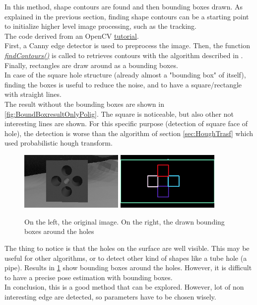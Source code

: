In this method, shape contours are found and then bounding boxes drawn. As explained in the previous section, finding shape contours can be a starting point to initialize higher level image processing, such as the tracking.\\
The code derived from an OpenCV \href{https://docs.opencv.org/3.4.6/de/d62/tutorial_bounding_rotated_ellipses.html}{tutorial}.\\
First, a Canny edge detector is used to preprocess the image. Then, the function \href{https://docs.opencv.org/3.4.6/d3/dc0/group__imgproc__shape.html#ga17ed9f5d79ae97bd4c7cf18403e1689a}{\textit{findContours()}} is called to retrieves contours with the algorithm described in \cite{findcountors}. Finally, rectangles are draw around as a bounding boxes.\\
In case of the square hole structure (already almost a "bounding box" of itself), finding the boxes is useful to reduce the noise, and to have a square/rectangle with straight lines.\\
The result without the bounding boxes are shown in \ref{fig:BoundBoxresultOnlyPolig}. The square is noticeable, but also other not interesting lines are shown. 
For this specific purpose (detection of square face of hole), the detection is worse than the algorithm of section \ref{sec:HoughTrasf} which used probabilistic hough transform.\\
\begin{figure}[H]
	\centering
	\includegraphics[width=5.0cm]{BoundBox_SourceOnlyRect}
	\qquad
	\includegraphics[width=5.0cm]{BoundBox_resultOnlyRect}
	\caption{On the left, the original image. On the right, the drawn bounding boxes around the holes}
	\label{fig:BoundBoxresultOnlyRect}
\end{figure}
The thing to notice is that the holes on the surface are well visible. This may be useful for other algorithms, or to detect other kind of shapes like a tube hole (a pipe). Results in \ref{fig:BoundBoxresultOnlyRect} show bounding boxes around the holes. However, it is difficult to have a precise pose estimation with bounding boxes.\\
In conclusion, this is a good method that can be explored.
However, lot of non interesting edge are detected, so parameters have to be chosen wisely.


